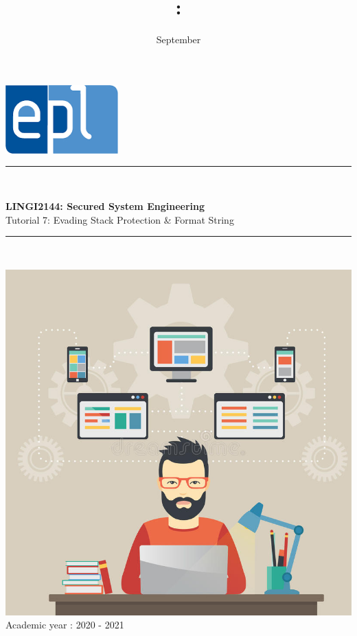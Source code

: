 \documentclass{article}
\title{\codecourse : \titlecourse}
\author{\othor}
\date{September \year}
\newcommand{\codecourse}{LINGI2144}
\newcommand{\titlecourse}{Secured System Engineering}
\newcommand{\ayear}{2020 - 2021}
\begin{document}
        \hfill\includegraphics[scale=0.5]{image/logoepl.png}
        
        \vspace*{\fill}
            
        \begin{center}
        
            \rule{1\textwidth}{1pt}\\
	            \vspace{0.5\baselineskip}
		            \begin{LARGE}
	                	\textbf{\codecourse : \titlecourse}\\
	                	Tutorial 7: Evading Stack Protection \& Format String
		            \end{LARGE}
		        \vspace{0.5\baselineskip}       
	        \rule{1\textwidth}{1pt}\\
	        
	        \vspace{0.5\baselineskip}
	        
	        \includegraphics[scale=1.5]{image/MCP.jpg}\\

	        \vspace{0.5\baselineskip}
	            Academic year : \ayear\\
                
		\end{center}
		
\end{document}
